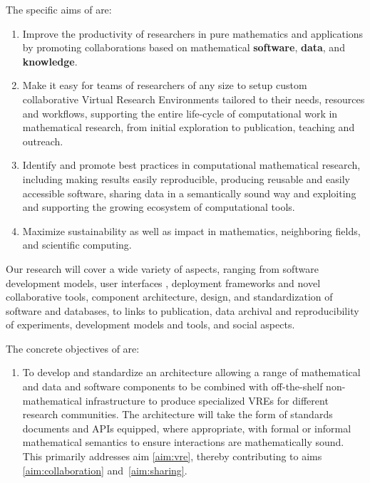 \documentclass[noworkareas,deliverables,\classoptions]{euproposal}       %
\begin{document}
\begin{proposal}
The specific aims of \TheProject are:
\begin{enumerate}
\item \label{aim:collaboration} Improve the productivity of
  researchers in pure mathematics and applications by promoting
  collaborations based on mathematical \textbf{software},
  \textbf{data}, and \textbf{knowledge}.
\item \label{aim:vre} Make it easy for teams of
  researchers of any size to setup custom collaborative Virtual Research
  Environments tailored to their needs, resources and workflows, supporting the
  entire life-cycle of computational work in mathematical research,
  from initial exploration to publication, teaching and outreach.
\item \label{aim:sharing} Identify and promote best practices in
  computational mathematical research, including making results easily
  reproducible, producing reusable and easily accessible
  software, sharing data in a semantically sound way and exploiting and
  supporting the growing ecosystem of computational tools.
\item \label{aim:impact} Maximize sustainability as well as impact in
  mathematics, neighboring fields, and scientific computing.
\end{enumerate}



Our research will cover a wide variety of aspects, ranging from
software development models, user interfaces , deployment frameworks and novel collaborative tools,
component architecture, design, and standardization of software
 and databases, to links to publication, data archival
and reproducibility of experiments, development models and tools, and
social aspects.

The concrete objectives of \TheProject are:

\begin{enumerate}
\item\label{objective:framework} To develop and standardize
  an architecture allowing a range of mathematical and
  data and software components to be combined 
  with off-the-shelf non-mathematical infrastructure to produce
  specialized VREs for different research communities. The
  architecture will take the form of standards documents and APIs
  equipped, where appropriate, with formal or informal mathematical
  semantics to ensure interactions are mathematically sound. This primarily
  addresses aim \ref{aim:vre}, thereby contributing to aims
  \ref{aim:collaboration} and~\ref{aim:sharing}. 


\end{enumerate}
\end{proposal}
\end{document}
